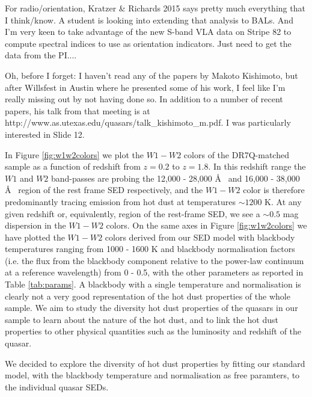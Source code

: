 For radio/orientation, Kratzer \& Richards 2015 says pretty much everything that I think/know.  
A student is looking into extending that analysis to BALs.  
And I'm very keen to take advantage of the new S-band VLA data on Stripe 82 to compute spectral indices to use as orientation indicators.  
Just need to get the data from the PI....

Oh, before I forget: I haven't read any of the papers by Makoto Kishimoto, but after Willsfest in Austin where he presented some of his work, I feel like I'm really missing out by not having done so. In addition to a number of recent papers, his talk from that meeting is at http://www.as.utexas.edu/quasars/talk\_kishimoto\_m.pdf. I was particularly interested in Slide 12.

In Figure \ref{fig:w1w2colors} we plot the $W1 - W2$ colors of the DR7Q-matched sample as a function of redshift from $z=0.2$ to $z=1.8$. In this redshift range the $W1$ and $W2$ band-passes are probing the 12,000 - 28,000 \AA~ and 16,000 - 38,000 \AA~ region of the rest frame SED respectively, and the $W1-W2$ color is therefore predominantly tracing emission from hot dust at temperatures $\sim 1200$ K. At any given redshift or, equivalently, region of the rest-frame SED, we see a $\sim 0.5$ mag dispersion in the $W1-W2$ colors. On the same axes in Figure \ref{fig:w1w2colors} we have plotted the $W1 - W2$ colors derived from our SED model with blackbody temperatures ranging from 1000 - 1600 K and blackbody normalisation factors (i.e. the flux from the blackbody component relative to the power-law continuum at a reference wavelength) from 0 - 0.5, with the other parameters as reported in Table \ref{tab:params}. A blackbody with a single temperature and normalisation is clearly not a very good representation of the hot dust properties of the whole sample. We aim to study the diversity hot dust properties of the quasars in our sample to learn about the nature of the hot dust, and to link the hot dust properties to other physical quantities such as the luminosity and redshift of the quasar. 

We decided to explore the diversity of hot dust properties by fitting our standard model, with the blackbody temperature and normalisation as free paramters, to the individual quasar SEDs. 




